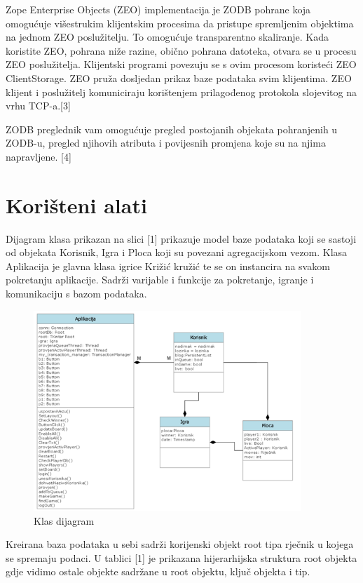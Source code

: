 \documentclass[]{foi} %
\begin{document}
Zope Enterprise Objects (ZEO) implementacija je ZODB pohrane koja omogućuje višestrukim klijentskim procesima da pristupe spremljenim objektima na jednom ZEO poslužitelju. To omogućuje transparentno skaliranje. Kada koristite ZEO, pohrana niže razine, obično pohrana datoteka, otvara se u procesu ZEO poslužitelja. Klijentski programi povezuju se s ovim procesom koristeći ZEO ClientStorage. ZEO pruža dosljedan prikaz baze podataka svim klijentima. ZEO klijent i poslužitelj komuniciraju korištenjem prilagođenog protokola slojevitog na vrhu TCP-a.[3]

ZODB preglednik vam omogućuje pregled postojanih objekata pohranjenih u ZODB-u, pregled njihovih atributa i povijesnih promjena koje su na njima napravljene. [4]


\chapter{Korišteni alati}

Dijagram klasa prikazan na slici [1] prikazuje model baze podataka koji se sastoji od objekata Korisnik, Igra i Ploca koji su povezani agregacijskom vezom. Klasa Aplikacija je glavna klasa igrice Križić kružić te se on instancira na svakom pokretanju aplikacije. Sadrži varijable i funkcije za pokretanje, igranje i komunikaciju s bazom podataka.

\begin{figure}[]
    \centering
    \includegraphics[width=0.9\textwidth]{slike/klas.png}
    \caption{Klas dijagram \cite{Vlastita izrada}}
    \label{fig:podjela}
\end{figure}

Kreirana baza podataka u sebi sadrži korijenski objekt root tipa rječnik u kojega se spremaju podaci. U tablici [1] je prikazana hijerarhijska struktura root objekta gdje vidimo ostale objekte sadržane u root objektu, ključ objekta i tip.
\end{document}

